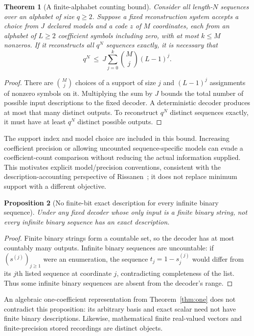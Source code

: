 \documentclass[11pt,a4paper]{article}
\newtheorem{theorem}{Theorem}
\newtheorem{proposition}[theorem]{Proposition}
\theoremstyle{definition}
\theoremstyle{remark}
\begin{document}
\begin{theorem}[A finite-alphabet counting bound]\label{thm:counting}
Consider all length-$N$ sequences over an alphabet of size $q\geq2$. Suppose a
fixed reconstruction system accepts a choice from $J$ declared models and a code
$z$ of $M$ coordinates, each from an alphabet of $L\geq2$ coefficient symbols
including zero, with at most $k\leq M$ nonzeros. If it reconstructs all $q^N$
sequences exactly, it is necessary that
\[
q^N\ \leq\ J\sum_{j=0}^{k}\binom{M}{j}(L-1)^j .
\]
\end{theorem}
\begin{proof}
There are $\binom Mj$ choices of a support of size $j$ and $(L-1)^j$ assignments
of nonzero symbols on it. Multiplying the sum by $J$ bounds the total number of
possible input descriptions to the fixed decoder. A deterministic decoder
produces at most that many distinct outputs. To reconstruct $q^N$ distinct
sequences exactly, it must have at least $q^N$ distinct possible outputs.
\end{proof}

The support index and model choice are included in this bound. Increasing
coefficient precision or allowing uncounted sequence-specific models can evade a
coefficient-count comparison without reducing the actual information supplied.
This motivates explicit model/precision conventions, consistent with the
description-accounting perspective of Rissanen~\cite{rissanen1978}; it does not
replace minimum support with a different objective.

\begin{proposition}[No finite-bit exact description for every infinite binary sequence]\label{prop:binary}
Under any fixed decoder whose only input is a finite binary string, not every
infinite binary sequence has an exact description.
\end{proposition}
\begin{proof}
Finite binary strings form a countable set, so the decoder has at most countably
many outputs. Infinite binary sequences are uncountable: if $(s^{(j)})_{j\geq1}$
were an enumeration, the sequence $t_j=1-s^{(j)}_j$ would differ from its $j$th
listed sequence at coordinate $j$, contradicting completeness of the list.
Thus some infinite binary sequences are absent from the decoder's range.
\end{proof}

An algebraic one-coefficient representation from Theorem~\ref{thm:one} does not
contradict this proposition: its arbitrary basis and exact scalar need not have
finite binary descriptions. Likewise, mathematical finite real-valued vectors
and finite-precision stored recordings are distinct objects.
\end{document}
